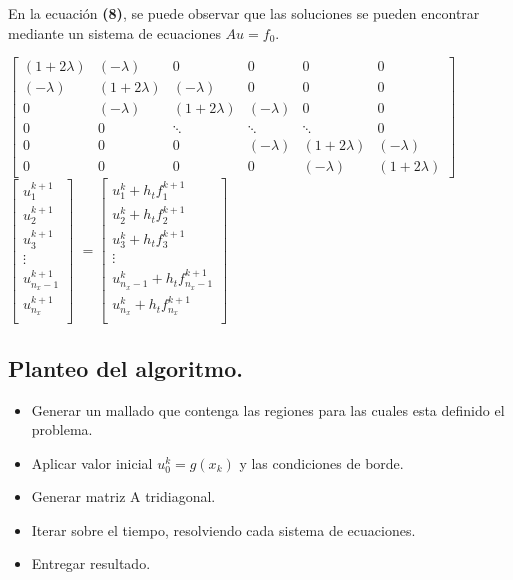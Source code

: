 \documentclass[12pt,letterpaper]{article}
\begin{document}
En la ecuación \textbf{(8)}, se puede observar que las soluciones se pueden encontrar mediante un sistema de ecuaciones $Au=f_0$.\\
\begin{center}
$
\begin{bmatrix}
(1+2\lambda) & (-\lambda) & 0 & 0 & 0 & 0 \\
(-\lambda) & (1+2\lambda) & (-\lambda) & 0 & 0 & 0 \\
0 & (-\lambda) & (1+2\lambda) & (-\lambda) & 0 & 0 \\
0 & 0 & \ddots & \ddots & \ddots & 0 \\
0 & 0 & 0 & (-\lambda) & (1+2\lambda) & (-\lambda)\\
0 & 0 &0&0&(-\lambda) & (1+2\lambda)
\end{bmatrix}
$
$
\begin{bmatrix}
u_1^{k+1} \\
u_2^{k+1} \\
u_3^{k+1} \\
\vdots \\
u_{n_x-1}^{k+1} \\
u_{n_x}^{k+1} \\
\end{bmatrix}
$
$=
\begin{bmatrix}
u_1^k + h_tf_1^{k+1} \\
u_2^k + h_tf_2^{k+1} \\
u_3^k + h_tf_3^{k+1} \\
\vdots \\
u_{n_x-1}^k + h_tf_{n_x-1}^{k+1} \\
u_{n_x}^k + h_tf_{n_x}^{k+1} \\
\end{bmatrix}
$
\end{center}

\subsection{Planteo del algoritmo.}
\begin{itemize}
	\item Generar un mallado que contenga las regiones para las cuales esta definido el problema.
	\item Aplicar valor inicial $u_0^k=g(x_k)$ y las condiciones de borde.
	\item Generar matriz A tridiagonal.
	\item Iterar sobre el tiempo, resolviendo cada sistema de ecuaciones.
	\item Entregar resultado.
\end{itemize}
\end{document}
